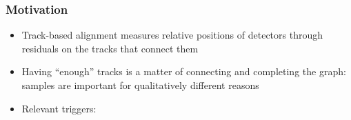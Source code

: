 \documentclass[compress]{beamer}
\begin{document}
\begin{frame}
\frametitle{Motivation}
\begin{itemize}
\item Track-based alignment measures relative positions of detectors through residuals on the tracks that connect them
\item Having ``enough'' tracks is a matter of connecting and completing the graph: samples are important for qualitatively different reasons
\item Relevant triggers: 
\end{itemize}

\begin{center}

\end{center}
\end{frame}
\end{document}
